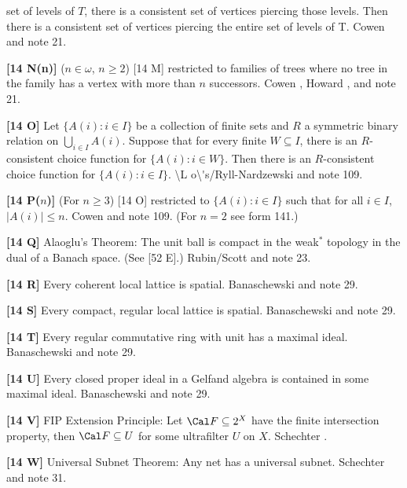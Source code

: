 set of levels of $T$, there is  a  consistent  set  of  vertices
piercing those levels.  Then there  is  a  consistent  set  of
vertices piercing the entire set of levels of T.  \ac{Cowen} \cite{1977b}
and note 21. 
\smallskip
\item{}{\bf [14 N(n)]} ($n\in\omega$, $n\ge 2$) [14 M] restricted
to families of trees where no tree in the family has a vertex with more
than $n$ successors.  \ac{Cowen} \cite{1977b}, \ac{Howard} \cite{1984a},
and note 21.
\smallskip
\item{}{\bf [14 O]}  Let $\{ A(i): i\in I\}$ be a collection of finite sets
and $R$ a symmetric binary relation on $\bigcup^{}_{i\in I}A(i)$. Suppose
that for every finite $W\subseteq I$, there is an $R$-consistent choice
function for $\{A(i): i\in W\}$.  Then there is an $R$-consistent choice
function for $\{A(i): i\in I\}$. \ac{\L o\'s/Ryll-Nardzewski} \cite{1951}
and note 109.
\smallskip
\item{}{\bf [14 P($n$)]} (For $n\ge 3$) [14 O] restricted to $\{A(i):
i\in I\}$ such that for all $i\in I$, $|A(i)|\le n$. \ac{Cowen}
\cite{1977b} and note 109. (For $n = 2$ see form 141.)
\smallskip
\item{}{\bf [14 Q]}  Alaoglu's Theorem:  The unit ball is compact in the
weak$^*$ topology in the dual of a Banach space.  (See [52 E].)
\ac{Rubin/Scott} \cite{1954} and note 23. 
\smallskip
\item{}{\bf [14 R]}  Every  coherent  local  lattice  is spatial.
\ac{Banaschewski} \cite{1981} and note 29.
\smallskip
\item{}{\bf [14 S]}  Every compact, regular local  lattice  is  spatial.
\ac{Banaschewski} \cite{1981} and note 29.
\smallskip
\item{}{\bf [14 T]}  Every regular commutative ring with unit has a
maximal ideal.  \ac{Banaschewski} \cite{1983} and note 29.
\smallskip
\item{}{\bf [14 U]}  Every closed proper ideal in a Gelfand algebra is
contained in some maximal ideal. \ac{Banaschewski} \cite{1983} and note 29.
\smallskip
\item{}{\bf [14 V]} FIP Extension Principle: Let ${\Cal F}\subseteq
2^{X}$  have the finite  intersection  property, then ${\Cal F}
\subseteq  U$  for   some ultrafilter $U$ on $X$.  \ac{Schechter}
\cite{1996a}.
\smallskip
\item{}{\bf [14 W]}  Universal Subnet Theorem:  Any net has a universal
subnet.  \ac{Schechter} \cite{1996a} and note 31.

